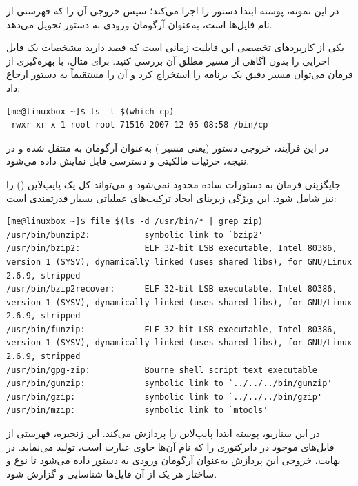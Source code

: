 در این نمونه، پوسته ابتدا دستور  را اجرا می‌کند؛ سپس خروجی آن را که فهرستی از نام فایل‌ها است، به‌عنوان آرگومان ورودی به دستور  تحویل می‌دهد.

یکی از کاربردهای تخصصی این قابلیت زمانی است که قصد دارید مشخصات یک فایل اجرایی را بدون آگاهی از مسیر مطلق آن بررسی کنید. برای مثال، با بهره‌گیری از فرمان  می‌توان مسیر دقیق یک برنامه را استخراج کرد و آن را مستقیماً به دستور  ارجاع داد:

\begin{latin}
\begin{lstlisting}
[me@linuxbox ~]$ ls -l $(which cp)
-rwxr-xr-x 1 root root 71516 2007-12-05 08:58 /bin/cp
\end{lstlisting}
\end{latin}

در این فرآیند، خروجی دستور  (یعنی مسیر ) به‌عنوان آرگومان به  منتقل شده و در نتیجه، جزئیات مالکیتی و دسترسی فایل  نمایش داده می‌شود.

جایگزینی فرمان به دستورات ساده محدود نمی‌شود و می‌تواند کل یک پایپ‌لاین () را نیز شامل شود. این ویژگی زیربنای ایجاد ترکیب‌های عملیاتی بسیار قدرتمندی است:

\begin{latin}
\begin{lstlisting}
[me@linuxbox ~]$ file $(ls -d /usr/bin/* | grep zip)
/usr/bin/bunzip2:           symbolic link to `bzip2'
/usr/bin/bzip2:             ELF 32-bit LSB executable, Intel 80386, version 1 (SYSV), dynamically linked (uses shared libs), for GNU/Linux 2.6.9, stripped
/usr/bin/bzip2recover:      ELF 32-bit LSB executable, Intel 80386, version 1 (SYSV), dynamically linked (uses shared libs), for GNU/Linux 2.6.9, stripped
/usr/bin/funzip:            ELF 32-bit LSB executable, Intel 80386, version 1 (SYSV), dynamically linked (uses shared libs), for GNU/Linux 2.6.9, stripped
/usr/bin/gpg-zip:           Bourne shell script text executable
/usr/bin/gunzip:            symbolic link to `../../../bin/gunzip'
/usr/bin/gzip:              symbolic link to `../../../bin/gzip'
/usr/bin/mzip:              symbolic link to `mtools'
\end{lstlisting}
\end{latin}

در این سناریو، پوسته ابتدا پایپ‌لاین  را پردازش می‌کند. این زنجیره، فهرستی از فایل‌های موجود در دایرکتوری  را که نام آن‌ها حاوی عبارت  است، تولید می‌نماید. در نهایت، خروجی این پردازش به‌عنوان آرگومان ورودی به دستور  داده می‌شود تا نوع و ساختار هر یک از آن فایل‌ها شناسایی و گزارش شود.

